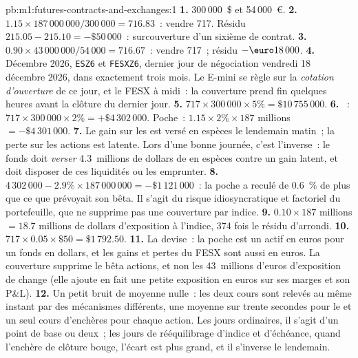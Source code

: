 \begin{solution}{pb:m1:futures-contracts-and-exchanges:1}
\textbf{1.} 300\,000~\$ et 54\,000~\euro.
\textbf{2.} $1.15 \times 187\,000\,000/300\,000 = 716.83$~: vendre 717. Résidu
$215.05 - 215.10 = -\$50\,000$~: surcouverture d'un sixième de contrat.
\textbf{3.} $0.90 \times 43\,000\,000/54\,000 = 716.67$~: vendre 717~; résidu
$-\text{\euro}18\,000$.
\textbf{4.} Décembre 2026, \texttt{ESZ6} et \texttt{FESXZ6}, dernier jour de négociation
vendredi 18 décembre 2026, dans exactement trois mois. Le E-mini se règle
sur la \emph{cotation d'ouverture} de ce jour, et le FESX à midi~: la
couverture prend fin quelques heures avant la clôture du dernier jour.
\textbf{5.} $717 \times 300\,000 \times 5\% = \$10\,755\,000$.
\textbf{6.} ~: $717 \times 300\,000 \times 2\% = +\$4\,302\,000$. Poche~:
$1.15 \times 2\% \times 187$ millions $= -\$4\,301\,000$.
\textbf{7.} Le gain sur les  est versé en espèces le lendemain matin~; la perte sur
les actions est latente. Lors d'une bonne journée, c'est l'inverse~: le fonds doit
\emph{verser} 4.3~millions de dollars de  en espèces contre un gain latent,
et doit disposer de ces liquidités ou les emprunter.
\textbf{8.} $4\,302\,000 - 2.9\% \times 187\,000\,000 = -\$1\,121\,000$~: la
poche a reculé de 0.6~\% de plus que ce que prévoyait son bêta. Il s'agit du risque idiosyncratique et
factoriel du portefeuille, que ne supprime pas une couverture par indice.
\textbf{9.} $0.10 \times 187$ millions $= 18.7$ millions de dollars d'exposition à l'indice,
374 fois le résidu d'arrondi.
\textbf{10.} $717 \times 0.05 \times \$50 = \$1\,792.50$.
\textbf{11.} La devise~: la poche est un actif en euros pour un fonds en dollars, et
les gains et pertes du FESX sont aussi en euros. La couverture supprime le
bêta actions, et non les 43~millions d'euros d'exposition de change (elle ajoute en fait une petite
exposition en euros sur ses marges et son P\&L).
\textbf{12.} Un petit bruit de moyenne nulle~: les deux cours sont relevés au
même instant par des mécanismes différents, une moyenne sur trente secondes pour le  et un seul cours d'enchères pour chaque action. Les jours ordinaires, il s'agit d'un point de base
ou deux~; les jours de rééquilibrage d'indice et d'échéance, quand l'enchère de clôture
bouge, l'écart est plus grand, et il s'inverse le lendemain.

\end{solution}
